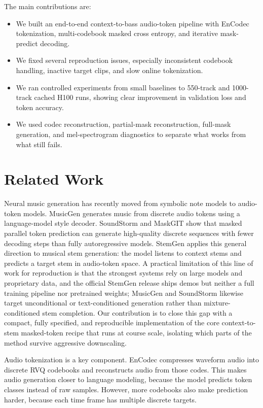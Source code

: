 \documentclass{article}
\begin{document}
The main contributions are:
\begin{itemize}
    \item We built an end-to-end context-to-bass audio-token pipeline with EnCodec tokenization, multi-codebook masked cross entropy, and iterative mask-predict decoding.
    \item We fixed several reproduction issues, especially inconsistent codebook handling, inactive target clips, and slow online tokenization.
    \item We ran controlled experiments from small baselines to 550-track and 1000-track cached H100 runs, showing clear improvement in validation loss and token accuracy.
    \item We used codec reconstruction, partial-mask reconstruction, full-mask generation, and mel-spectrogram diagnostics to separate what works from what still fails.
\end{itemize}

\section{Related Work}

Neural music generation has recently moved from symbolic note models to audio-token models. MusicGen \citep{musicgen} generates music from discrete audio tokens using a language-model style decoder. SoundStorm \citep{soundstorm} and MaskGIT \citep{maskgit} show that masked parallel token prediction can generate high-quality discrete sequences with fewer decoding steps than fully autoregressive models. StemGen \citep{stemgen} applies this general direction to musical stem generation: the model listens to context stems and predicts a target stem in audio-token space. A practical limitation of this line of work for reproduction is that the strongest systems rely on large models and proprietary data, and the official StemGen release ships demos but neither a full training pipeline nor pretrained weights; MusicGen and SoundStorm likewise target unconditional or text-conditioned generation rather than mixture-conditioned stem completion. Our contribution is to close this gap with a compact, fully specified, and reproducible implementation of the core context-to-stem masked-token recipe that runs at course scale, isolating which parts of the method survive aggressive downscaling.

Audio tokenization is a key component. EnCodec \citep{encodec} compresses waveform audio into discrete RVQ codebooks and reconstructs audio from those codes. This makes audio generation closer to language modeling, because the model predicts token classes instead of raw samples. However, more codebooks also make prediction harder, because each time frame has multiple discrete targets.
\end{document}
